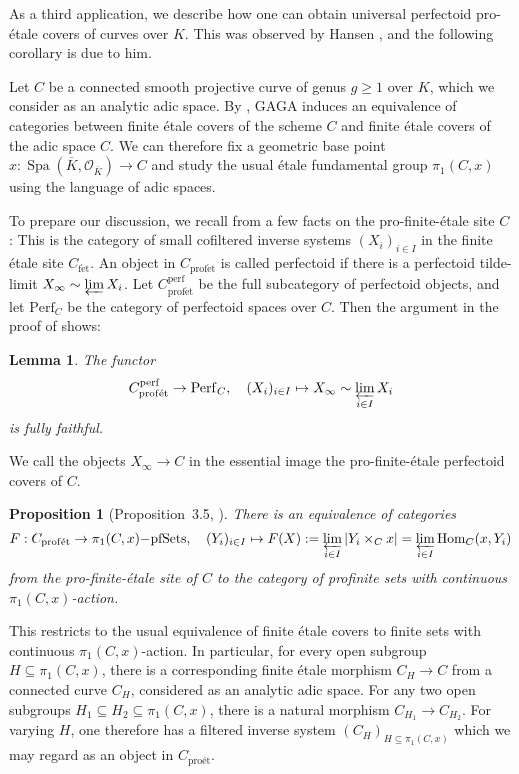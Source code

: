 \documentclass[10pt,oneside]{amsart}
\newtheorem{lemma}[theorem]{Lemma}
\newtheorem{proposition}[theorem]{Proposition}
\theoremstyle{definition}
\newcommand{\Spa}{\operatorname{Spa}}
\newcommand{\Hom}{\operatorname{Hom}}
\newcommand{\perf}{{\operatorname{perf}}}
\newcommand{\fet}{\operatorname{f\acute{e}t}}
\newcommand{\profet}{\operatorname{prof\acute{e}t}}
\renewcommand{\O}{\mathcal{O}}
\begin{document}
As a third application, we describe how one can obtain universal perfectoid pro-\'etale covers of curves over $K$. This was observed by Hansen \cite{Hansen-blog}, and the following corollary is due to him.
	
	Let $C$ be a connected smooth projective curve of genus $g\geq 1$ over $K$, which we consider as an analytic adic space. By \cite[Theorem 3.1]{LutRiemann}, GAGA induces an equivalence of categories between finite \'etale covers of the scheme $C$ and finite \'etale covers of the adic space $C$. We can therefore fix a geometric base point $x:\Spa(\overline{K},\O_{\overline{K}})\to C$ and study the usual \'etale fundamental group $\pi_1(C,x)$ using the language of adic spaces. 
	
	To prepare our discussion, we recall from \cite[\S3]{p-adic_Hodge} a few facts on the pro-finite-\'etale site $C$: This is the category of small cofiltered inverse systems $(X_i)_{i\in I}$ in the finite \'etale site $C_{\fet}$. An object in $C_{\profet}$ is called perfectoid if there is a perfectoid tilde-limit $X_\infty\sim \varprojlim X_i$. Let $C_{\profet}^{\perf}$ be the full subcategory of perfectoid objects, and let $\mathrm{Perf}_C$ be the category of perfectoid spaces over $C$. Then the argument in the proof of \cite[Lemma 8.2.3]{berkeley} shows:
\begin{lemma}\label{l:profet-perf-tilde-limit-fully-faithful}
	The functor
	\[C_{\profet}^{\perf}\to  \mathrm{Perf}_{C},\quad (X_i)_{i\in I}\mapsto X_\infty\sim \varprojlim_{i\in I} X_i\]
is fully faithful.	
\end{lemma}
	We call the objects $X_\infty \to C$ in the essential image the pro-finite-\'etale perfectoid covers of $C$.
	\begin{proposition}[Proposition~3.5, \cite{p-adic_Hodge}]
		There is an equivalence of categories
		\[ F:C_{\mathrm{prof\acute{e}t}}\to \pi_{1}(C,x)\mathrm{-pfSets},\quad (Y_i)_{i\in I} \mapsto F(X):=\varprojlim_{i\in I}|Y_i\times_{C}x|=\varprojlim_{i\in I}\Hom_C(x,Y_i)\]
		from the pro-finite-\'etale site of $C$ to the category of profinite sets with continuous $\pi_{1}(C,x)$-action.
	\end{proposition}
	This restricts to the usual equivalence of finite \'etale covers to finite sets with continuous $\pi_{1}(C,x)$-action. 
	In particular, for every open subgroup $H\subseteq \pi_1(C,x)$, there is a corresponding finite \'etale morphism $C_H\to C$ from a connected curve $C_H$, considered as an analytic adic space. For any two open subgroups $H_1\subseteq H_2\subseteq \pi_1(C,x)$, there is a natural morphism $C_{H_1}\to C_{H_2}$. For varying $H$, one therefore has a filtered inverse system $(C_H)_{H\subseteq \pi_1(C,x)}$ which we may regard as an object in $C_{\text{pro\'et}}$.
\end{document}
